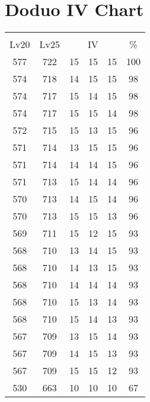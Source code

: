 \documentclass{article}%
\begin{document}
%
\normalsize%
\section{Doduo IV Chart}%
\label{sec:Doduo IV Chart}%
\renewcommand{\arraystretch}{1.5}%
\begin{tabular}{|c|c|c|c|c|c|}%
\hline%
\multicolumn{6}{|c|}{\textcolor{white}{ 
\linebreak{Doduo}
}%
\cellcolor{black}}\\%
\multicolumn{1}{|c}{Lv20}&\multicolumn{1}{c|}{Lv25}&\multicolumn{3}{c|}{IV}&\multicolumn{1}{|c|}{\%}\\%
\hline%
\rowcolor{color100}%
577&722&15&15&15&100\\%
\hline%
\rowcolor{color98}%
574&718&14&15&15&98\\%
\hline%
\rowcolor{color98}%
574&717&15&14&15&98\\%
\hline%
\rowcolor{color98}%
574&717&15&15&14&98\\%
\hline%
\rowcolor{color96}%
572&715&15&13&15&96\\%
\hline%
\rowcolor{color96}%
571&714&13&15&15&96\\%
\hline%
\rowcolor{color96}%
571&714&14&14&15&96\\%
\hline%
\rowcolor{color96}%
571&713&15&14&14&96\\%
\hline%
\rowcolor{color96}%
570&713&14&15&14&96\\%
\hline%
\rowcolor{color96}%
570&713&15&15&13&96\\%
\hline%
\rowcolor{color93}%
569&711&15&12&15&93\\%
\hline%
\rowcolor{color93}%
568&710&13&14&15&93\\%
\hline%
\rowcolor{color93}%
568&710&14&13&15&93\\%
\hline%
\rowcolor{color93}%
568&710&14&14&14&93\\%
\hline%
\rowcolor{color93}%
568&710&15&13&14&93\\%
\hline%
\rowcolor{color93}%
568&710&15&14&13&93\\%
\hline%
\rowcolor{color93}%
567&709&13&15&14&93\\%
\hline%
\rowcolor{color93}%
567&709&14&15&13&93\\%
\hline%
\rowcolor{color93}%
567&709&15&15&12&93\\%
\hline%
\rowcolor{color91}%
530&663&10&10&10&67\\%
\end{tabular}

%
\end{document}
